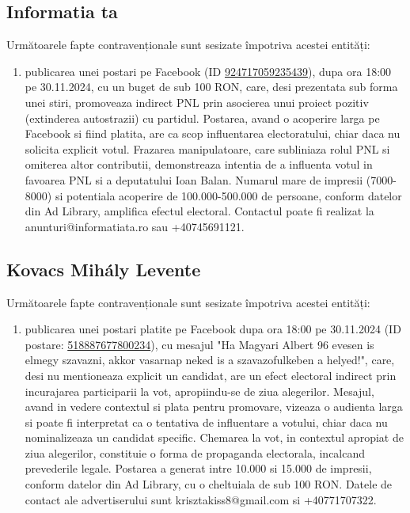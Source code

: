 \documentclass[a4paper,12pt]{article}
\begin{document}
\vspace{0.5cm}

\subsection{Informatia ta}
Următoarele fapte contravenționale sunt sesizate împotriva acestei entități:

\begin{enumerate}[leftmargin=*, label=\arabic*.)]
    \item publicarea unei postari pe Facebook (ID \href{https://www.facebook.com/ads/library/?id=924717059235439}{924717059235439}), dupa ora 18:00 pe 30.11.2024, cu un buget de sub 100 RON, care, desi prezentata sub forma unei stiri, promoveaza indirect PNL prin asocierea unui proiect pozitiv (extinderea autostrazii) cu partidul. Postarea, avand o acoperire larga pe Facebook si fiind platita, are ca scop influentarea electoratului, chiar daca nu solicita explicit votul. Frazarea manipulatoare, care subliniaza rolul PNL si omiterea altor contributii, demonstreaza intentia de a influenta votul in favoarea PNL si a deputatului Ioan Balan.  Numarul mare de impresii (7000-8000) si potentiala acoperire de 100.000-500.000 de persoane, conform datelor din Ad Library, amplifica efectul electoral.  Contactul poate fi realizat la anunturi@informatiata.ro sau +40745691121.
\end{enumerate}

\vspace{0.5cm}

\subsection{Kovacs Mihály Levente}
Următoarele fapte contravenționale sunt sesizate împotriva acestei entități:

\begin{enumerate}[leftmargin=*, label=\arabic*.)]
    \item publicarea unei postari platite pe Facebook dupa ora 18:00 pe 30.11.2024 (ID postare: \href{https://www.facebook.com/ads/library/?id=518887677800234}{518887677800234}), cu mesajul "Ha Magyari Albert 96 evesen is elmegy szavazni, akkor vasarnap neked is a szavazofulkeben a helyed!", care, desi nu mentioneaza explicit un candidat, are un efect electoral indirect prin incurajarea participarii la vot, apropiindu-se de ziua alegerilor.  Mesajul, avand in vedere contextul si plata pentru promovare, vizeaza o audienta larga si poate fi interpretat ca o tentativa de influentare a votului, chiar daca nu nominalizeaza un candidat specific.  Chemarea la vot, in contextul apropiat de ziua alegerilor, constituie o forma de propaganda electorala, incalcand prevederile legale.  Postarea a generat intre 10.000 si 15.000 de impresii, conform datelor din Ad Library, cu o cheltuiala de sub 100 RON.  Datele de contact ale advertiserului sunt krisztakiss8@gmail.com si +40771707322.
\end{enumerate}
\end{document}
